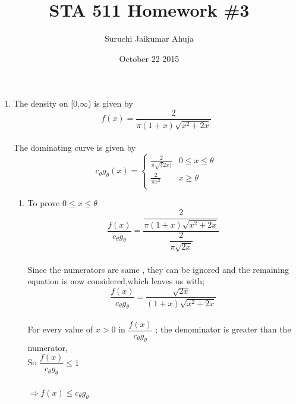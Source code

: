 \documentclass[letterpaper]{article}
\begin{document}
\title{STA 511 Homework \#3}
\date{October 22 2015}
\author{Suruchi Jaikumar Ahuja}
\maketitle

\begin{enumerate}

\item The density on [0,$\infty$) is given by 
\begin{equation*}
          f(x)=\dfrac{2}{\pi(1+x) \sqrt{x^2+2x}}
\end{equation*}\\

The dominating curve is given by\\
\begin{equation*}
c_{\theta} g_{\theta}(x)=
\begin{cases}
\frac{2}{\pi \sqrt(2x)} & 0 \leq x \leq \theta\\
\frac{2}{\pi x^2} & x \geq \theta\\
\end{cases}
\end{equation*}

\begin{enumerate}

\item 	To prove $0 \leq x \leq \theta $
\begin{equation*}
\dfrac{f(x)}{c_{\theta}g_{\theta}} =\dfrac{\dfrac{2}{\pi(1+x) \sqrt{x^2+2x}}}{\dfrac{2}{\pi\sqrt{2x}}}
\end{equation*}\\

Since the numerators are same , they can be ignored and the remaining equation is now considered,which leaves us with;\\

\begin{equation*}
\dfrac{f(x)}{c_{\theta}g_{\theta}} =\dfrac{\sqrt{2x}} {(1+x)\sqrt{x^2+2x}}
\end{equation*}\\

 For every value of $x > 0$ in $ \dfrac{f(x)}{c_{\theta}g_{\theta}}$ ; the denominator is greater than the numerator,\\

So $\dfrac{f(x)}{c_{\theta} g_{\theta}} \leq 1 $\\\\

$\Rightarrow f(x) \leq c_{\theta} g_{\theta}$\\


\end{enumerate}
\end{enumerate}
\end{document}
